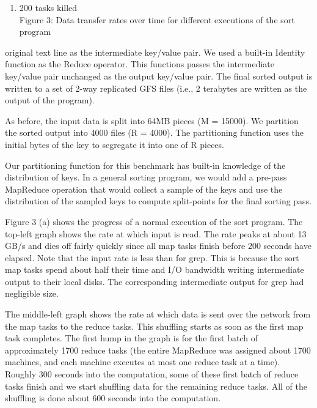 \documentclass[
]{article}
\providecommand{\tightlist}{%
  \setlength{\itemsep}{0pt}\setlength{\parskip}{0pt}}
\begin{document}
\begin{enumerate}
\def\labelenumi{(\alph{enumi})}
\setcounter{enumi}{2}
\tightlist
\item
  200 tasks killed\\
  Figure 3: Data transfer rates over time for different executions of
  the sort program
\end{enumerate}

original text line as the intermediate key/value pair. We used a
built-in Identity function as the Reduce operator. This functions passes
the intermediate key/value pair unchanged as the output key/value pair.
The final sorted output is written to a set of 2-way replicated GFS
files (i.e., 2 terabytes are written as the output of the program).

As before, the input data is split into 64MB pieces (M = 15000). We
partition the sorted output into 4000 files (R = 4000). The partitioning
function uses the initial bytes of the key to segregate it into one of R
pieces.

Our partitioning function for this benchmark has built-in knowledge of
the distribution of keys. In a general sorting program, we would add a
pre-pass MapReduce operation that would collect a sample of the keys and
use the distribution of the sampled keys to compute split-points for the
final sorting pass.

Figure 3 (a) shows the progress of a normal execution of the sort
program. The top-left graph shows the rate at which input is read. The
rate peaks at about 13 GB/s and dies off fairly quickly since all map
tasks finish before 200 seconds have elapsed. Note that the input rate
is less than for grep. This is because the sort map tasks spend about
half their time and I/O bandwidth writing intermediate output to their
local disks. The corresponding intermediate output for grep had
negligible size.

The middle-left graph shows the rate at which data is sent over the
network from the map tasks to the reduce tasks. This shuffling starts as
soon as the first map task completes. The first hump in the graph is for
the first batch of approximately 1700 reduce tasks (the entire MapReduce
was assigned about 1700 machines, and each machine executes at most one
reduce task at a time). Roughly 300 seconds into the computation, some
of these first batch of reduce tasks finish and we start shuffling data
for the remaining reduce tasks. All of the shuffling is done about 600
seconds into the computation.
\end{document}
